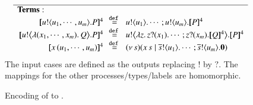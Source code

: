 \begin{figure}[t]
\[\begin{array}{rcl}
\hline
{\bf Terms:}\hspace{2.5cm}\\
		\map{\bout{u}{u_1, \cdots, u_m} P}^{4}
		&\!\!\defeq\!\!&
		\bout{u}{u_1} \cdots ;  \bout{u}{u_m} \map{P}^{4}
		\\
		\map{\bbout{u}{\abs{(x_1, \cdots, x_m)} Q} P}^{4}
		&\!\!\defeq\!\!&
		\bbout{u}{\abs{z}\binp{z}{x_1}\cdots ; \binp{z}{x_m} \map{Q}^{4}} \map{P}^{4}
		\\ 
		\map{\appl{x}{(u_1, \cdots, u_m)}}^{4}
		&\!\!\defeq\!\!&
		\newsp{s}{\appl{x}{s} \Par \bout{\dual{s}}{u_1} \cdots ; \bout{\dual{s}}{u_m} \inact} 
        \\ 
	\end{array}
\]
The input cases are defined as the outputs replacing $!$ by $?$. 
The mappings for the other processes/types/labels are 
homomorphic. 
\caption{\label{f:enc:poltomon}
Encoding of \PHOp to \HOp.
}
\Hline 
\end{figure}


 
 









